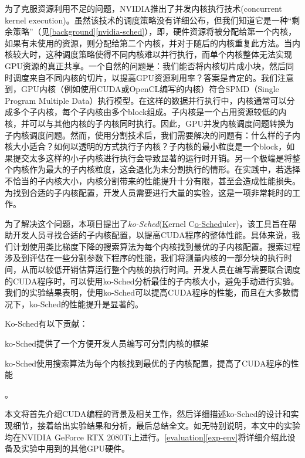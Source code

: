 为了克服资源利用不足的问题，NVIDIA推出了并发内核执行技术(concurrent kernel execution)\cite{concurrent-kernel-execution}。虽然该技术的调度策略没有详细公布，但我们知道它是一种“剩余策略”（见\autoref{background}\autoref{nvidia-sched}），即，硬件资源将被分配给第一个内核，如果有未使用的资源，则分配给第二个内核，并对于随后的内核重复此方法。当内核较大时，这种调度策略使得不同内核难以并行执行，而单个内核整体无法实现GPU资源的真正共享。一个自然的问题是：我们能否将内核切片成小块，然后同时调度来自不同内核的切片，以提高GPU资源利用率？答案是肯定的。我们注意到，GPU内核（例如使用CUDA或OpenCL编写的内核）符合SPMD（Single Program Multiple Data）执行模型。在这样的数据并行执行中，内核通常可以分成多个子内核，每个子内核由多个block组成。子内核是一个占用资源较低的内核，并可以与其他内核的子内核同时执行。因此，GPU并发内核调度问题转换为子内核调度问题。然而，使用分割技术后，我们需要解决的问题有：什么样的子内核大小适合？如何以透明的方式执行子内核？子内核的最小粒度是一个block，如果提交太多这样的小子内核进行执行会导致显著的运行时开销。另一个极端是将整个内核作为最大的子内核粒度，这会退化为未分割执行的情形。在实践中，若选择不恰当的子内核大小，内核分割带来的性能提升十分有限，甚至会造成性能损失。为找到合适的子内核配置，开发人员需要进行大量的实验，这是一项非常耗时的工作。

为了解决这个问题，本项目提出了\emph{ko-Sched}(\underline{K}ernel C\underline{o-Sched}uler)，该工具旨在帮助开发人员寻找合适的子内核配置，以提高CUDA程序的整体性能。具体来说，我们计划使用类比梯度下降的搜索算法为每个内核找到最优的子内核配置。搜索过程涉及到评估在一些分割参数下程序的性能，我们将测量内核的一部分块的执行时间，从而以较低开销估算运行整个内核的执行时间。开发人员在编写需要联合调度的CUDA程序时，可以使用ko-Sched分析最佳的子内核大小，避免手动进行实验。我们的实验结果表明，使用ko-Sched可以提高CUDA程序的性能，而且在大多数情况下，ko-Sched的性能提升是显著的。


Ko-Sched有以下贡献：
\begin{enumerate*}[label=\roman*),itemjoin={\quad}]
    \item ko-Sched提供了一个方便开发人员编写可分割内核的框架
    \item ko-Sched使用搜索算法为每个内核找到最优的子内核配置，提高了CUDA程序的性能
\end{enumerate*}
。

本文将首先介绍CUDA编程的背景及相关工作，然后详细描述ko-Sched的设计和实现细节，接着给出实验结果和分析，最后总结全文。如无特别说明，本文中的实验均在NVIDIA GeForce RTX 2080Ti上进行。\autoref{evaluation}\autoref{exp-env}将详细介绍此设备及实验中用到的其他GPU硬件。
